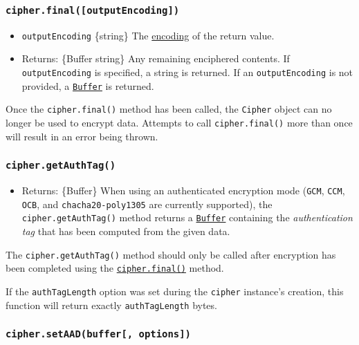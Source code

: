 \subsubsection{\texorpdfstring{\texttt{cipher.final({[}outputEncoding{]})}}{cipher.final({[}outputEncoding{]})}}\label{cipher.finaloutputencoding}

\begin{itemize}
\tightlist
\item
  \texttt{outputEncoding} \{string\} The
  \href{buffer.md\#buffers-and-character-encodings}{encoding} of the
  return value.
\item
  Returns: \{Buffer \textbar{} string\} Any remaining enciphered
  contents. If \texttt{outputEncoding} is specified, a string is
  returned. If an \texttt{outputEncoding} is not provided, a
  \href{buffer.md}{\texttt{Buffer}} is returned.
\end{itemize}

Once the \texttt{cipher.final()} method has been called, the
\texttt{Cipher} object can no longer be used to encrypt data. Attempts
to call \texttt{cipher.final()} more than once will result in an error
being thrown.

\subsubsection{\texorpdfstring{\texttt{cipher.getAuthTag()}}{cipher.getAuthTag()}}\label{cipher.getauthtag}

\begin{itemize}
\tightlist
\item
  Returns: \{Buffer\} When using an authenticated encryption mode
  (\texttt{GCM}, \texttt{CCM}, \texttt{OCB}, and
  \texttt{chacha20-poly1305} are currently supported), the
  \texttt{cipher.getAuthTag()} method returns a
  \href{buffer.md}{\texttt{Buffer}} containing the \emph{authentication
  tag} that has been computed from the given data.
\end{itemize}

The \texttt{cipher.getAuthTag()} method should only be called after
encryption has been completed using the
\hyperref[cipherfinaloutputencoding]{\texttt{cipher.final()}} method.

If the \texttt{authTagLength} option was set during the \texttt{cipher}
instance's creation, this function will return exactly
\texttt{authTagLength} bytes.

\subsubsection{\texorpdfstring{\texttt{cipher.setAAD(buffer{[},\ options{]})}}{cipher.setAAD(buffer{[}, options{]})}}\label{cipher.setaadbuffer-options}

